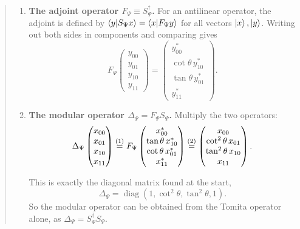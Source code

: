 \begin{quote}
\begin{enumerate}
\item \textbf{The adjoint operator $F_\Psi \equiv S_\Psi^\dagger$.} For an antilinear operator, the adjoint is
defined by $\braket{y|S_\Psi x} = \braket{x|F_\Psi y}$ for all vectors $\ket x,\ket y$. Writing out both
sides in components and comparing gives
\[
F_\Psi \begin{pmatrix} y_{00} \\ y_{01} \\ y_{10} \\ y_{11} \end{pmatrix}
= \begin{pmatrix} y_{00}^* \\ \cot\theta\, y_{10}^* \\ \tan\theta\, y_{01}^* \\ y_{11}^* \end{pmatrix} .
\]

\item \textbf{The modular operator $\Delta_\Psi = F_\Psi S_\Psi$.} Multiply the two operators:
\begin{align}
\Delta_\Psi \begin{pmatrix} x_{00} \\ x_{01} \\ x_{10} \\ x_{11} \end{pmatrix}
\overset{(1)}{=} F_\Psi \begin{pmatrix} x_{00}^* \\ \tan\theta\, x_{10}^* \\ \cot\theta\, x_{01}^* \\ x_{11}^*
\end{pmatrix}
\overset{(2)}{=} \begin{pmatrix} x_{00} \\ \cot^2\theta\, x_{01} \\ \tan^2\theta\, x_{10} \\ x_{11} \end{pmatrix} .
\notag
\end{align}
\quad
{}

This is exactly the diagonal matrix found at the start,
\[
\Delta_\Psi = \operatorname{diag}(1, \cot^2\theta, \tan^2\theta, 1) .
\]
So the modular operator can be obtained from the Tomita operator alone, as
$\Delta_\Psi=S_\Psi^\dagger S_\Psi$.


\end{enumerate}
\end{quote}
